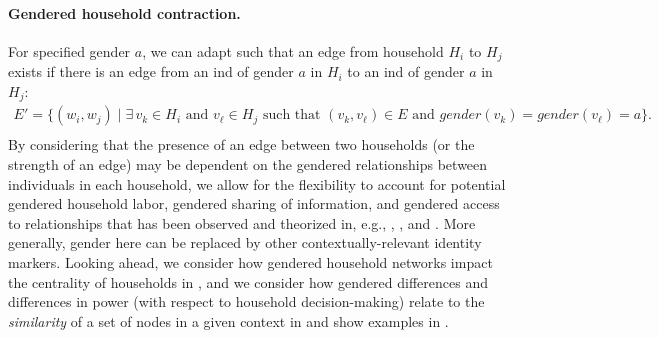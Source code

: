 \paragraph{Gendered household contraction.} For specified gender $a$, we can adapt  such that an edge from household $H_i$ to $H_j$ exists if there is an edge from an \acl{ind} of gender $a$ in $H_i$ to an \acl{ind} of gender $a$ in $H_j$: 
\begin{equation*} \label{eq:gendered_con}
    \begin{aligned}
        E' = \{ (w_i, w_j) \mid \exists \, v_k \in H_i \textrm{ and } v_\ell \in H_j \textrm{ such that } (v_k, v_\ell) \in E    \textrm{ and } gender(v_k)=gender(v_\ell) = a\}.\\
    \end{aligned}
\end{equation*}
By considering that the presence of an edge between two households (or the strength of an edge) may be dependent on the gendered relationships between individuals in each household, we allow for the flexibility to account for potential gendered household labor, gendered sharing of information, and gendered access to relationships that has been observed and theorized in, e.g., \cite{werner1998}, \cite{berti2015adequacy}, and \cite{wallace2002household}. More generally, gender here can be replaced by other contextually-relevant identity markers. Looking ahead, we consider how gendered household networks impact the centrality of households in , and we consider how gendered differences and differences in power (with respect to household decision-making) relate to the \textit{similarity} of a set of nodes in a given context in  and show examples in . 

